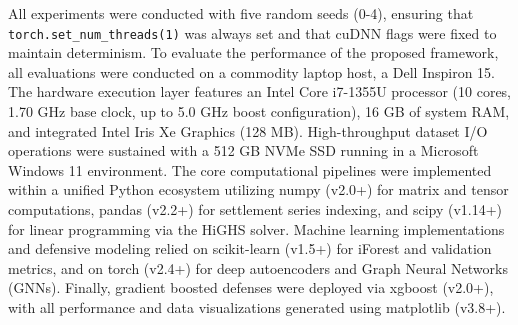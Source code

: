 \documentclass[journal]{IEEEtran}
\begin{document}
All experiments were conducted with five random seeds (0-4), ensuring that \texttt{torch.set\_num\_threads(1)} was always set and that cuDNN flags were fixed to maintain determinism.
To evaluate the performance of the proposed framework, all evaluations were conducted on a commodity laptop host, a Dell Inspiron 15. The hardware execution layer features an Intel Core i7-1355U processor (10 cores, 1.70 GHz base clock, up to 5.0 GHz boost configuration), 16 GB of system RAM, and integrated Intel Iris Xe Graphics (128 MB). 
High-throughput dataset I/O operations were sustained with a 512 GB NVMe SSD running in a Microsoft Windows 11 environment. 
The core computational pipelines were implemented within a unified Python ecosystem utilizing numpy (v2.0+) for matrix and tensor computations, pandas (v2.2+) for settlement series indexing, and scipy (v1.14+) for linear programming via the HiGHS solver. 
Machine learning implementations and defensive modeling relied on scikit-learn (v1.5+) for iForest and validation metrics, and on torch (v2.4+) for deep autoencoders and Graph Neural Networks (GNNs). Finally, gradient boosted defenses were deployed via xgboost (v2.0+), with all performance and data visualizations generated using matplotlib (v3.8+).
\end{document}
